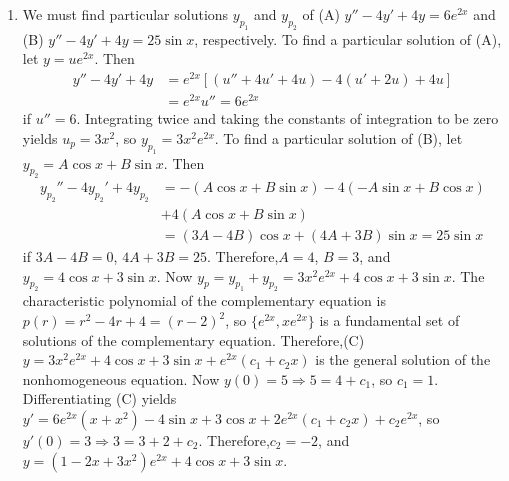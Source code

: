 \documentclass[openany]{book}
\newenvironment{sectionSolutions}{
 \begin{enumerate}[item-label={\thesection.\arabic{enumi}.}]
}{
 \end{enumerate}
}
\begin{document}
\begin{sectionSolutions}
\item
We must find particular solutions $y_{p_1}$ and $y_{p_2}$ of
(A) $y''-4y'+4y=6e^{2x}$ and
(B) $y''-4y'+4y=25\sin x$, respectively.
To find a particular solution of (A), let
 $y=ue^{2x}$. Then
\begin{align*}
y''-4y'+4y&=e^{2x}\left[(u''+4u'+4u)-4(u'+2u)+4u\right]\\
&=e^{2x}u''=6e^{2x}
\end{align*}
if $u''=6$. Integrating twice and taking the constants of integration
to be zero yields $u_p=3x^2$, so $y_{p_1}=3x^2e^{2x}$.
To find a particular solution of (B), let
 $y_{p_2}=A\cos x+B\sin x$. Then
\begin{align*}
y_{p_2}''-4y_{p_2}'+4y_{p_2}&=-(A\cos x+B\sin x)-4(-A\sin x+B\cos x)\\
&+4(A\cos x+B\sin x)\\
&=(3A-4B)\cos x+(4A+3B)\sin x=25\sin x
\end{align*}
if $3A-4B=0$, $4A+3B=25$. Therefore,$A=4$, $B=3$, and $y_{p_2}=4\cos
x+3\sin x$. Now $y_p=y_{p_1}+y_{p_2}=3x^2e^{2x}+4\cos x+3\sin x$. The
characteristic polynomial of the complementary equation is
$p(r)=r^2-4r+4=(r-2)^2$, so $\{e^{2x},xe^{2x}\}$ is a fundamental set
of solutions of the complementary equation. Therefore,(C)
$y=3x^2e^{2x}+4\cos x+3\sin x+e^{2x}(c_1+c_2x)$ is the general
solution of the nonhomogeneous equation. Now $y(0)=5\Rightarrow
5=4+c_1$, so $c_1=1$. Differentiating (C) yields
$y'=6e^{2x}(x+x^2)-4\sin x+3\cos x+2e^{2x}(c_1+c_2x)+c_2e^{2x}$, so
$y'(0)=3\Rightarrow 3=3+2+c_2$. Therefore,$c_2=-2$, and
$y=(1-2x+3x^2)e^{2x}+4\cos x+3\sin x$.




\end{sectionSolutions}
\end{document}
